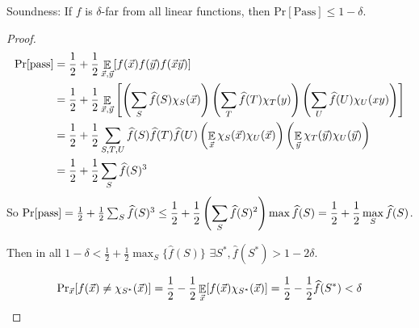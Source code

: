 Soundness: If $  f  $ is  $ \delta $-far from all linear functions, then  $ \mathrm{Pr}[\text{Pass}] \leq 1-\delta $.
\begin{proof}
    \[\begin{aligned}
        \mathrm{Pr}[\text{pass}]&=\frac{1}{2}+\frac{1}{2}\mathop\mathbb E_{\vec{x},\vec{y}}[f(\vec{x})f(\vec{y})f(\vec{x}\vec{y})]\\
        &=\frac{1}{2}+\frac{1}{2}\mathop\mathbb E_{\vec{x},\vec{y}}\left[\left(\sum_{S}\widehat{f}(S)\chi_S(\vec{x})\right)\left(\sum_T\widehat{f}(T)\chi_T(y)\right)\left(\sum_U\widehat{f}(U)\chi_U(xy)\right)\right]\\
        &=\frac{1}{2}+\frac{1}{2}\sum_{S,T,U}\widehat{f}(S)\widehat{f}(T)\widehat{f}(U)\left(\mathop\mathbb E_{\vec{x}}\chi_S(\vec{x})\chi_U(\vec{x})\right)\left(\mathop\mathbb E_{\vec{y}}\chi_T(\vec{y})\chi_U(\vec{y})\right)\\
        &=\frac{1}{2}+\frac{1}{2}\sum_S\widehat{f}(S)^3
    \end{aligned}\]
    So  $ \mathrm{Pr}[\text{pass}]=\frac{1}{2}+\frac{1}{2}\sum_S\widehat{f}(S)^3 \leq \displaystyle\frac{1}2{}+\frac{1}{2}\left(\sum_S\widehat{f}(S)^2\right)\max\widehat{f}(S)=\frac{1}{2}+\frac{1}{2}\max_S\widehat{f}(S) $.

    Then in all  $ 1-\delta<\frac{1}{2}+\frac{1}{2}\max_{S}\{\hat{f}(S)\} $ \ie  $ \exists S^*,\hat{f}(S^*)>1-2\delta $.
    
    \[\mathrm{Pr}_{\vec{x}}[f(\vec{x})\neq \chi_{S^*}(\vec{x})]=\frac{1}{2}-\frac{1}{2}\mathop\mathbb E_{\vec{x}}[f(\vec{x})\chi_{S^*}(\vec{x})]=\frac{1}{2}-\frac{1}{2}\widehat{f}(S^*)<\delta\]
\end{proof}  